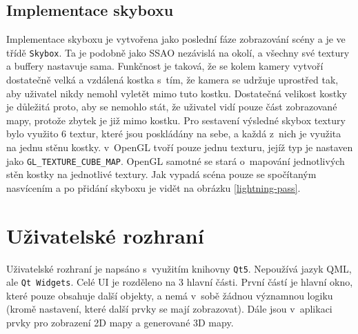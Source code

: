 \subsection*{Implementace skyboxu}
Implementace skyboxu je vytvořena jako poslední fáze zobrazování scény a je ve třídě \verb|Skybox|. Ta je podobně jako SSAO nezávislá na okolí, a všechny své textury a buffery nastavuje sama. Funkčnost je taková, že se kolem kamery vytvoří dostatečně velká a vzdálená kostka s~tím, že kamera se udržuje uprostřed tak, aby uživatel nikdy nemohl vyletět mimo tuto kostku. Dostatečná velikost kostky je důležitá proto, aby se nemohlo stát, že uživatel vidí pouze část zobrazované mapy, protože zbytek je již mimo kostku. Pro sestavení výsledné skybox textury bylo využito 6 textur, které jsou poskládány na sebe, a každá z~nich je využita na jednu stěnu kostky. v~OpenGL tvoří pouze jednu texturu, jejíž typ je nastaven jako \verb|GL_TEXTURE_CUBE_MAP|. OpenGL samotné se stará o~mapování jednotlivých stěn kostky na jednotlivé textury. Jak vypadá scéna pouze se spočítaným nasvícením a po přidání skyboxu je vidět na obrázku \ref{lightning-pass}.

\section{Uživatelské rozhraní}
Uživatelské rozhraní je napsáno s~využitím knihovny \verb|Qt5|. Nepoužívá jazyk QML, ale \verb|Qt Widgets|. Celé UI je rozděleno na 3 hlavní části. První částí je hlavní okno, které pouze obsahuje další objekty, a nemá v~sobě žádnou významnou logiku (kromě nastavení, které další prvky se mají zobrazovat). Dále jsou v~aplikaci prvky pro zobrazení 2D mapy a generované 3D mapy.

